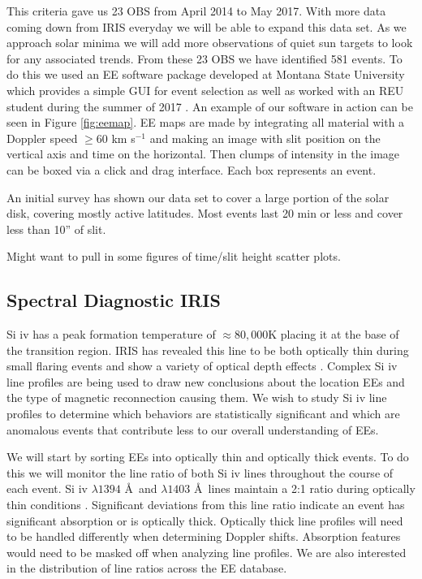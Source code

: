 \documentclass[]{aastex6}
\begin{document}
	This criteria gave us 23 OBS from April 2014 to May 2017.  With more data coming down from IRIS everyday we will be able to expand this data set.  As we approach solar minima we will add more observations of quiet sun targets to look for any associated trends.  From these 23 OBS we have identified 581 events.  To do this we used an EE software package developed at Montana State University which provides a simple GUI for event selection as well as worked with an REU student during the summer of 2017 \citep{Bartz2018}.  An example of our software in action can be seen in Figure \ref{fig:eemap}.  EE maps are made by integrating all material with a Doppler speed $\geq60$ km s$^{-1}$ and making an image with slit position on the vertical axis and time on the horizontal.  Then clumps of intensity in the image can be boxed via a click and drag interface.  Each box represents an event.
	
	An initial survey has shown our data set to cover a large portion of the solar disk, covering mostly active latitudes.  Most events last 20 min or less and cover less than 10'' of slit.
	
	Might want to pull in some figures of time/slit height scatter plots.

	
	\subsection{Spectral Diagnostic IRIS}
	Si {\sc iv} has a peak formation temperature of $\approx 80,000$K placing it at the base of the transition region.  IRIS has revealed this line to be both optically thin during small flaring events and show a variety of optical depth effects \citep{Peter2014,Yan2015}.  Complex Si {\sc iv} line profiles are being used to draw new conclusions about the location EEs and the type of magnetic reconnection causing them.  We wish to study Si {\sc iv} line profiles to determine which behaviors are statistically significant and which are anomalous events that contribute less to our overall understanding of EEs.
	
	We will start by sorting EEs into optically thin and optically thick events. To do this we will monitor the line ratio of both Si {\sc iv} lines throughout the course of each event.  Si {\sc iv} $\lambda 1394$ \AA \ and $\lambda 1403$ \AA \ lines maintain a 2:1 ratio during optically thin conditions  \citep{Mathioudakis1999}.  Significant deviations from this line ratio indicate an event has significant absorption or is optically thick.  Optically thick line profiles will need to be handled differently when determining Doppler shifts.  Absorption features would need to be masked off when analyzing line profiles. We are also interested in the distribution of line ratios across the EE database.
	
\end{document}
